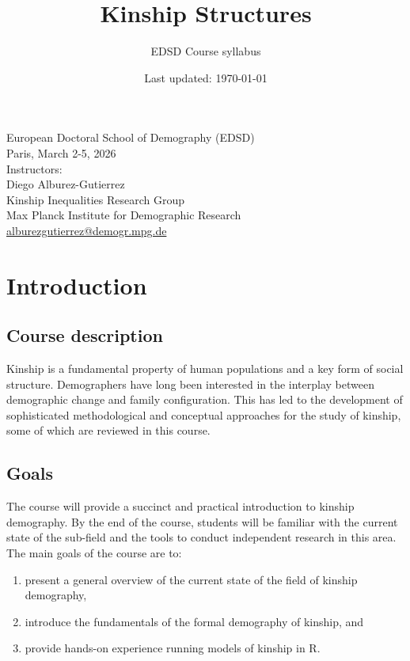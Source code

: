 ﻿\documentclass{article}
\title{Kinship Structures}
\author{EDSD Course syllabus}
\date{Last updated: \today}
\begin{document}
\maketitle

\noindent
European Doctoral School of Demography (EDSD)\\
Paris, March 2-5, 2026\\

\noindent
Instructors:\\
Diego Alburez-Gutierrez\\
Kinship Inequalities Research Group\\
Max Planck Institute for Demographic Research\\
\href{mailto:alburezgutierrez@demogr.mpg.de}{alburezgutierrez@demogr.mpg.de}\\



\section{Introduction}

\subsection{Course description}

Kinship is a fundamental property of human populations and a key form of social structure.
Demographers have long been interested in the interplay between demographic change and family configuration.
This has led to the development of sophisticated methodological and conceptual approaches for the study of kinship, some of which are reviewed in this course. 

\subsection{Goals}

The course will provide a succinct and practical introduction to kinship demography. 
By the end of the course, students will be familiar with the current state of the sub-field and the tools to conduct independent research in this area. 
The main goals of the course are to:

\begin{enumerate}
    \item present a general overview of the current state of the field of kinship demography,
    \item introduce the fundamentals of the formal demography of kinship, and
    \item provide hands-on experience running models of kinship in R.
\end{enumerate}
\end{document}
